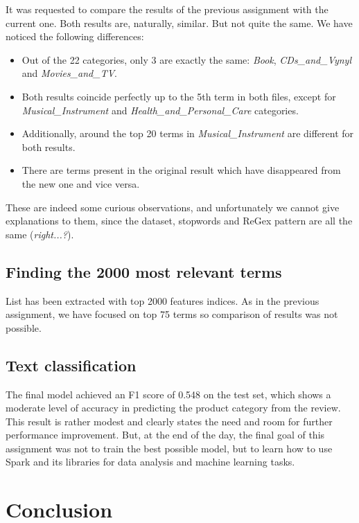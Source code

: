 \documentclass[11pt]{article}
\begin{document}
It was requested to compare the results of the previous assignment with the current one. Both results are, naturally, similar. But not quite the same. We have noticed the following differences:
\begin{itemize}
    \item Out of the 22 categories, only 3 are exactly the same: \textit{Book}, \textit{CDs\_and\_Vynyl} and \textit{Movies\_and\_TV}.
    \item Both results coincide perfectly up to the 5th term in both files, except for \textit{Musical\_Instrument} and \textit{Health\_and\_Personal\_Care} categories.
    \item Additionally, around the top 20 terms in \textit{Musical\_Instrument} are different for both results.
    \item There are terms present in the original result which have disappeared from the new one and vice versa.
\end{itemize}

These are indeed some curious observations, and unfortunately we cannot give explanations to them, since the dataset, stopwords and ReGex pattern are all the same (\textit{right...?}).

\subsection{Finding the 2000 most relevant terms}

List has been extracted with top 2000 features indices. As in the previous assignment, we have focused on top 75 terms so comparison of results was not possible.

\subsection{Text classification}

The final model achieved an F1 score of 0.548 on the test set, which shows a moderate level of accuracy in predicting the product category from the review. This result is rather modest and clearly states the need and room for further performance improvement. But, at the end of the day, the final goal of this assignment was not to train the best possible model, but to learn how to use Spark and its libraries for data analysis and machine learning tasks.


\section{Conclusion}
\end{document}
